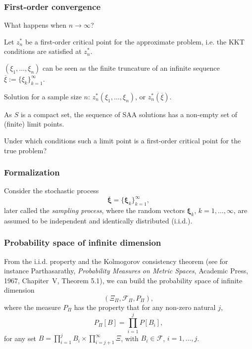 \documentclass{beamer}
\def\bxi{\boldsymbol\xi}
\begin{document}
\begin{frame}
\frametitle{First-order convergence}

What happens when $n \rightarrow \infty$?

\mbox{}

Let {\red $z_n^*$ be a first-order critical point} for the approximate problem, i.e. the KKT conditions are satisfied at $z_n^*$.

\mbox{}

$(\xi_1,\ldots,\xi_n)$ can be seen as the finite truncature of an infinite sequence $\overline{\xi} := \lbrace \xi_k \rbrace_{k =   1}^{\infty}$.

\mbox{}

Solution for a sample size $n$: $z_n^*(\xi_1,\ldots,\xi_n)$, or $z_n^*\left(\overline{\xi}\right)$.

\mbox{}

As $S$ is a compact set, the sequence of SAA solutions has a non-empty set of (finite) limit points.

\mbox{}

{\blue Under which conditions such a limit point is a first-order critical point for the true problem?}

\end{frame}

\begin{frame}
\frametitle{Formalization}



Consider the stochastic process
\[
\overline{\bxi} = \lbrace \bxi_k \rbrace_{k = 1}^{\infty},
\]
later called the {\it sampling process}, where the random vectors $\bxi_k$, $k = 1,\ldots, \infty$, are assumed to be independent and identically distributed (i.i.d.).

\end{frame}

\begin{frame}
\frametitle{Probability space of infinite dimension}

From the i.i.d. property and the Kolmogorov consistency theorem (see for instance Parthasarathy, {\sl Probability Measures on Metric   Spaces}, Academic Press, 1967, Chapiter~V, Theorem 5.1), we can build the probability space of infinite dimension
\[
\left( \Xi_{\Pi}, \mathcal{F}_{\Pi}, P_{\Pi} \right),
\]
where the measure $P_{\Pi}$ has the property that for any non-zero natural $j$,
\[
P_{\Pi}[B] = \prod_{i = 1}^j P[B_i],
\]
for any set $B = \prod_{i=1}^j B_i \times \prod_{i=j+1}^{\infty} \Xi$, with $B_i \in \mathcal{F}$, $i =
1,\ldots,j$.

\end{frame}
\end{document}
